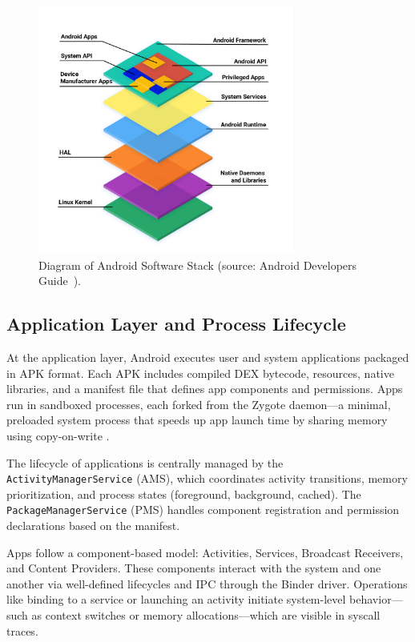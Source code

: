 \documentclass[a4paper,12pt]{report}
\begin{document}
\begin{figure}[H]
    \centering
    \includegraphics[width=0.75\textwidth]{android_stack_diagram.png}
    \caption{Diagram of Android Software Stack (source: Android Developers Guide~\cite{AOSPArchOverview}).}
    \label{fig:android_stack}
\end{figure}

\subsection{Application Layer and Process Lifecycle}
At the application layer, Android executes user and system applications packaged in APK format. Each APK includes compiled DEX bytecode, resources, native libraries, and a manifest file that defines app components and permissions. Apps run in sandboxed processes, each forked from the Zygote daemon—a minimal, preloaded system process that speeds up app launch time by sharing memory using copy-on-write \cite{AOSPArchOverview}.

The lifecycle of applications is centrally managed by the \texttt{ActivityManagerService} (AMS), which coordinates activity transitions, memory prioritization, and process states (foreground, background, cached). The \texttt{PackageManagerService} (PMS) handles component registration and permission declarations based on the manifest.

Apps follow a component-based model: Activities, Services, Broadcast Receivers, and Content Providers. These components interact with the system and one another via well-defined lifecycles and IPC through the Binder driver. Operations like binding to a service or launching an activity initiate system-level behavior—such as context switches or memory allocations—which are visible in syscall traces.
\end{document}
